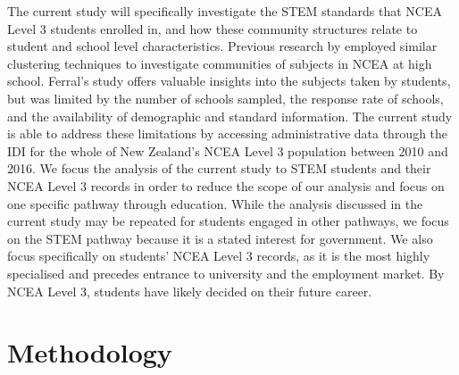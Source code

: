 The current study will specifically investigate the STEM standards that NCEA Level 3 students enrolled in, and how these community structures relate to student and school level characteristics. Previous research by \citet{ferral2005clustering} employed similar clustering techniques to investigate communities of subjects in NCEA at high school. Ferral's study offers valuable insights into the subjects taken by students, but was limited by the number of schools sampled, the response rate of schools, and the availability of demographic and standard information. The current study is able to address these limitations by accessing administrative data through the IDI for the whole of New Zealand's NCEA Level 3 population between 2010 and 2016. We focus the analysis of the current study to STEM students and their NCEA Level 3 records in order to reduce the scope of our analysis and focus on one specific pathway through education. While the analysis discussed in the current study may be repeated for students engaged in other pathways, we focus on the STEM pathway because it is a stated interest for government. We also focus specifically on students' NCEA Level 3 records, as it is the most highly specialised and precedes entrance to university and the employment market. By NCEA Level 3, students have likely decided on their future career.

\section{Methodology}

